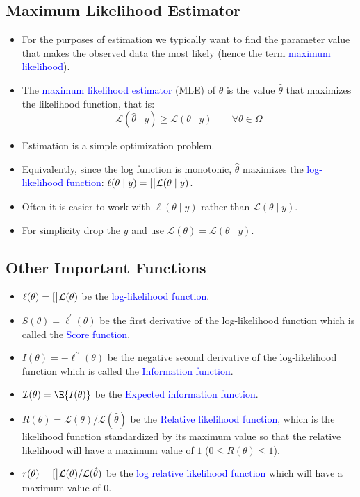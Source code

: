 \documentclass[oneside]{book}\usepackage[]{graphicx}\usepackage[svgnames]{xcolor}
\let\log\relax%
\begin{document}
\subsection*{Maximum Likelihood Estimator}
\begin{itemize}
      \item For the purposes of estimation we typically want to find the parameter value that
            makes the observed data the most likely (hence the term \textcolor{Blue}{maximum likelihood}).
      \item The \textcolor{Blue}{maximum likelihood estimator} (MLE) of $ \theta $ is the value $ \hat{\theta} $ that maximizes the
            likelihood function, that is:
            \[ \mathcal{L}(\hat{\theta}\mid y)\ge \mathcal{L}(\theta\mid y)\qquad\forall \theta\in \Omega \]
      \item Estimation is a simple optimization problem.
      \item Equivalently, since the log function is monotonic, $ \hat{\theta} $ maximizes the \textcolor{Blue}{log-likelihood function}:
            $ \ell(\theta\mid y)=\log[\big]{\mathcal{L}(\theta\mid y)} $.
      \item Often it is easier to work with $ \ell(\theta\mid y) $ rather than $ \mathcal{L}(\theta\mid y) $.
      \item For simplicity drop the $ y $ and use $ \mathcal{L}(\theta)=\mathcal{L}(\theta\mid y) $.
\end{itemize}
\subsection*{Other Important Functions}
\begin{itemize}
      \item $ \ell(\theta)=\log[\big]{\mathcal{L}(\theta)} $ be the \textcolor{Blue}{log-likelihood function}.
      \item $ S(\theta)=\ell^\prime(\theta) $ be the first derivative of the log-likelihood function which is called
            the \textcolor{Blue}{Score function}.
      \item $ I(\theta)=-\ell^{\prime\prime}(\theta) $ be the negative second derivative of the log-likelihood function
            which is called the \textcolor{Blue}{Information function}.
      \item $ \mathcal{I}(\theta)=\E{I(\theta)} $ be the \textcolor{Blue}{Expected information function}.
      \item $ R(\theta)=\mathcal{L}(\theta)/\mathcal{L}(\hat{\theta}) $ be the \textcolor{Blue}{Relative likelihood function}, which is the likelihood
            function standardized by its maximum value so that the relative likelihood will
            have a maximum value of $ 1 $ ($ 0\le R(\theta)\le 1 $).
      \item $ r(\theta)=\log[\big]{\mathcal{L}(\theta)/\mathcal{L}(\hat{\theta})} $ be the \textcolor{Blue}{log relative likelihood function} which
            will have a maximum value of $ 0 $.
\end{itemize}
\end{document}
